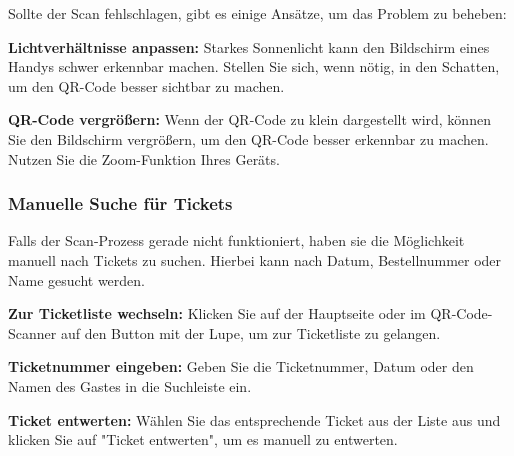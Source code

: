 Sollte der Scan fehlschlagen, gibt es einige Ansätze, um das Problem zu beheben:

\textbf{Lichtverhältnisse anpassen:} Starkes Sonnenlicht kann den Bildschirm eines Handys schwer erkennbar machen. Stellen Sie sich, wenn nötig, in den Schatten, um den QR-Code besser sichtbar zu machen.

\textbf{QR-Code vergrößern:} Wenn der QR-Code zu klein dargestellt wird, können Sie den Bildschirm vergrößern, um den QR-Code besser erkennbar zu machen. Nutzen Sie die Zoom-Funktion Ihres Geräts.


\subsubsection{Manuelle Suche für Tickets}

Falls der Scan-Prozess gerade nicht funktioniert, haben sie die Möglichkeit manuell nach Tickets zu suchen. Hierbei kann nach Datum, Bestellnummer oder Name gesucht werden.

\textbf{Zur Ticketliste wechseln:} Klicken Sie auf der Hauptseite oder im QR-Code-Scanner auf den Button mit der Lupe, um zur Ticketliste zu gelangen.

\textbf{Ticketnummer eingeben:} Geben Sie die Ticketnummer, Datum oder den Namen des Gastes in die Suchleiste ein.

\textbf{Ticket entwerten:} Wählen Sie das entsprechende Ticket aus der Liste aus und klicken Sie auf "Ticket entwerten", um es manuell zu entwerten.

